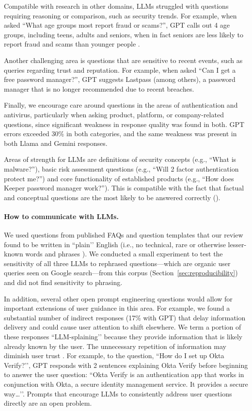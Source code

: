 Compatible with research in other domains, LLMs struggled with questions requiring reasoning or comparison, such as security trends. For example, when asked ``What age groups most report fraud or scams?'', GPT calls out 4 age groups, including teens, adults and seniors, when in fact seniors are less likely to report fraud and scams than younger people \cite{ftc_scams_all_ages_2022}.

Another challenging area is questions that are sensitive to recent events, such as queries regarding trust and reputation. For example, when asked ``Can I get a free password manager?'', GPT suggests Lastpass (among others), a password manager that is no longer recommended due to recent breaches.

Finally, we encourage care around questions in the areas of authentication and antivirus, particularly when asking product, platform, or company-related questions, since significant weakness in response quality was found in both. GPT errors exceeded 30\% in both categories, and the same weakness was present in both Llama and Gemini responses. 

Areas of strength for LLMs are definitions of security concepts (e.g., ``What is malware?''), basic risk assessment questions (e.g., ``Will 2 factor authentication protect me?'') and core functionality of established products (e.g., ``How does Keeper password manager work?''). This is compatible with the fact that factual and conceptual questions are the most likely to be answered correctly (). 

\paragraph{How to communicate with LLMs.} We used questions from published FAQs and question templates that our review found to be written in ``plain’’ English (i.e., no technical, rare or otherwise lesser-known words and phrases \cite{williams2004legal}). We conducted a small experiment to test the sensitivity of all three LLMs to rephrased questions---which are organic user queries seen on Google search---from this corpus (Section~\ref{sec:reproducibility}) and did not find sensitivity to phrasing.


In addition, several other open prompt engineering questions would allow for important extensions of user guidance in this area. For example, we found a substantial number of indirect responses (17\% with GPT) that delay information delivery and could cause user attention to shift elsewhere. We term a portion of these responses ``LLM-splaining’’ because they provide information that is likely already known by the user. The unnecessary repetition of information may diminish user trust \cite{zeffane2011communication}. For example, to the question, ``How do I set up Okta Verify?’’, GPT responds with 2 sentences explaining Okta Verify before beginning to answer the user question: ``Okta Verify is an authentication app that works in conjunction with Okta, a secure identity management service. It provides a secure way…’’. Prompts that encourage LLMs to consistently address user questions directly are an open problem.

